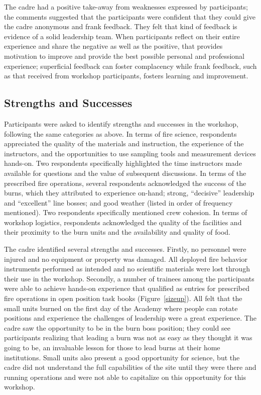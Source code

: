 \documentclass[fire,casereport,accept,moreauthors,pdftex]{Definitions/mdpi}  %
\begin{document}
The cadre had a positive take-away from weaknesses expressed by participants; the comments suggested that the participants were confident that they could give the cadre anonymous and frank feedback.
They felt that kind of feedback is evidence of a solid leadership team. 
When participants reflect on their entire experience and share the negative as well as the positive, that provides motivation to improve and provide the best possible personal and professional experience; superficial feedback can foster complacency while frank feedback, such as that received from workshop participants, fosters learning and improvement. 

\subsection{Strengths and Successes}

Participants were asked to identify strengths and successes in the workshop, following the same categories as above.
In terms of fire science, respondents appreciated the quality of the materials and instruction, the experience of the instructors, and the opportunities to use sampling tools and measurement devices hands-on.
Two respondents specifically highlighted the time instructors made available for questions and the value of subsequent discussions.
In terms of the prescribed fire operations, several respondents acknowledged the success of the burns, which they attributed to experience on-hand; strong, ``decisive'' leadership and ``excellent'' line bosses; and good weather (listed in order of frequency mentioned).
Two respondents specifically mentioned crew cohesion.
In terms of workshop logistics, respondents acknowledged the quality of the facilities and their proximity to the burn units and the availability and quality of food.

The cadre identified several strengths and successes.
Firstly, no personnel were injured and no equipment or property was damaged.
All deployed fire behavior instruments performed as intended and no scientific materials were lost through their use in the workshop.
Secondly, a number of trainees among the participants were able to achieve hands-on experience that qualified as entries for prescribed fire operations in open position task books (Figure~\ref{sizeup}).
All felt that the small units burned on the first day of the Academy where people can rotate positions and experience the challenges of leadership were a great experience.
The cadre saw the opportunity to be in the burn boss position; they could see participants realizing that leading a burn was not as easy as they thought it was going to be, an invaluable lesson for those to lead burns at their home institutions.
Small units also present a good opportunity for science, but the cadre did not understand the full capabilities of the site until they were there and running operations and were not able to capitalize on this opportunity for this workshop.
\end{document}
